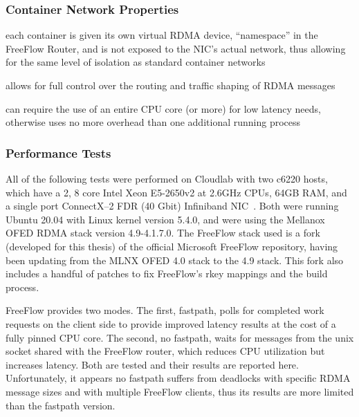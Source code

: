 \documentclass[12pt,titlepage]{article}
\begin{document}
\subsubsection*{Container Network Properties}
\begin{description}[nolistsep,font={{\scshape\bfseries}}]
	\item[Network Isolation] each container is given its own virtual RDMA device, ``namespace'' in the FreeFlow Router, and is not exposed to the NIC's actual network, thus allowing for the same level of isolation as standard container networks
	\item[Controllability] allows for full control over the routing and traffic shaping of RDMA messages
	\item[Resource Utilization] can require the use of an entire CPU core (or more) for low latency needs, otherwise uses no more overhead than one additional running process
\end{description}

\subsubsection*{Performance Tests}
All of the following tests were performed on Cloudlab with two c6220 hosts, which have a 2, 8 core Intel Xeon E5-2650v2 at 2.6GHz CPUs, 64GB RAM, and a single port ConnectX--2 FDR (40 Gbit) Infiniband NIC~\cite{cloudlab}. 
Both were running Ubuntu 20.04 with Linux kernel version 5.4.0, and were using the Mellanox OFED RDMA stack version 4.9-4.1.7.0.
The FreeFlow stack used is a fork (developed for this thesis) of the official Microsoft FreeFlow repository, having been updating from the MLNX OFED 4.0 stack to the 4.9 stack.
This fork also includes a handful of patches to fix FreeFlow's rkey mappings and the build process.

FreeFlow provides two modes.
The first, fastpath, polls for completed work requests on the client side to provide improved latency results at the cost of a fully pinned CPU core.
The second, no fastpath, waits for messages from the unix socket shared with the FreeFlow router, which reduces CPU utilization but increases latency.
Both are tested and their results are reported here. 
Unfortunately, it appears no fastpath suffers from deadlocks with specific RDMA message sizes and with multiple FreeFlow clients, thus its results are more limited than the fastpath version.
\end{document}
